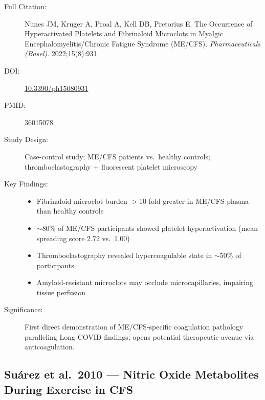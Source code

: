 \begin{description}
    \item[Full Citation:] Nunes JM, Kruger A, Proal A, Kell DB, Pretorius E\@. The Occurrence of Hyperactivated Platelets and Fibrinaloid Microclots in Myalgic Encephalomyelitis/Chronic Fatigue Syndrome (ME/CFS). \textit{Pharmaceuticals (Basel)}. 2022;15(8):931.
    \item[DOI:] \href{https://doi.org/10.3390/ph15080931}{10.3390/ph15080931}
    \item[PMID:] 36015078
    \item[Study Design:] Case-control study; ME/CFS patients vs.\ healthy controls; thromboelastography + fluorescent platelet microscopy
    \item[Key Findings:]
    \begin{itemize}
        \item Fibrinaloid microclot burden $>$10-fold greater in ME/CFS plasma than healthy controls
        \item $\sim$80\% of ME/CFS participants showed platelet hyperactivation (mean spreading score 2.72 vs.\ 1.00)
        \item Thromboelastography revealed hypercoagulable state in $\sim$50\% of participants
        \item Amyloid-resistant microclots may occlude microcapillaries, impairing tissue perfusion
    \end{itemize}
    \item[Significance:] First direct demonstration of ME/CFS-specific coagulation pathology paralleling Long COVID findings; opens potential therapeutic avenue via anticoagulation.
\end{description}

\subsection{Suárez et al.\ 2010 --- Nitric Oxide Metabolites During Exercise in CFS}

